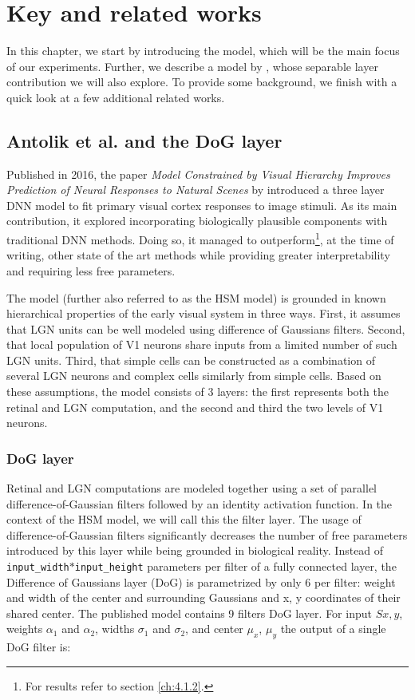 \chapter{Key and related works}\label{ch:2}

In this chapter, we start by introducing the \cite{antolik} model, which will be the main focus of our experiments. Further, we describe a model by \cite{klindt}, whose separable layer contribution we will also explore. To provide some background, we finish with a quick look at a few additional related works.

\section{Antolik et al. and the DoG layer}

Published in 2016, the paper \textit{Model Constrained by Visual Hierarchy Improves Prediction of Neural Responses to Natural Scenes} by \cite{antolik} introduced a three layer DNN model to fit primary visual cortex responses to image stimuli. As its main contribution, it explored incorporating biologically plausible components with traditional DNN methods. Doing so, it managed to outperform\footnote{For results refer to section \ref{ch:4.1.2}.}, at the time of writing, other state of the art methods while providing greater interpretability and requiring less free parameters.

The model (further also referred to as the HSM model) is grounded in known hierarchical properties of the early visual system in three ways. First, it assumes that LGN units can be well modeled using difference of Gaussians filters. Second, that local population of V1 neurons share inputs from a limited number of such LGN units. Third, that simple cells can be constructed as a combination of several LGN neurons and complex cells similarly from simple cells. Based on these assumptions, the model consists of 3 layers: the first represents both the retinal and LGN computation, and the second and third the two levels of V1 neurons.

\subsection{DoG layer}\label{ch:2.1.1}

Retinal and LGN computations are modeled together using a set of parallel difference-of-Gaussian filters followed by an identity activation function. In the context of the HSM model, we will call this the filter layer. The usage of difference-of-Gaussian filters significantly decreases the number of free parameters introduced by this layer while being grounded in biological reality. Instead of \texttt{input\_width}$*$\texttt{input\_height} parameters per filter of a fully connected layer, the Difference of Gaussians layer (DoG) is parametrized by only 6 per filter: weight and width of the center and surrounding Gaussians and x, y coordinates of their shared center. The published model contains 9 filters DoG layer. For input $S{x,y}$, weights $\alpha_1$ and $\alpha_2$, widths $\sigma_1$ and $\sigma_2$, and center $\mu_x$, $\mu_y$ the output of a single DoG filter is:

